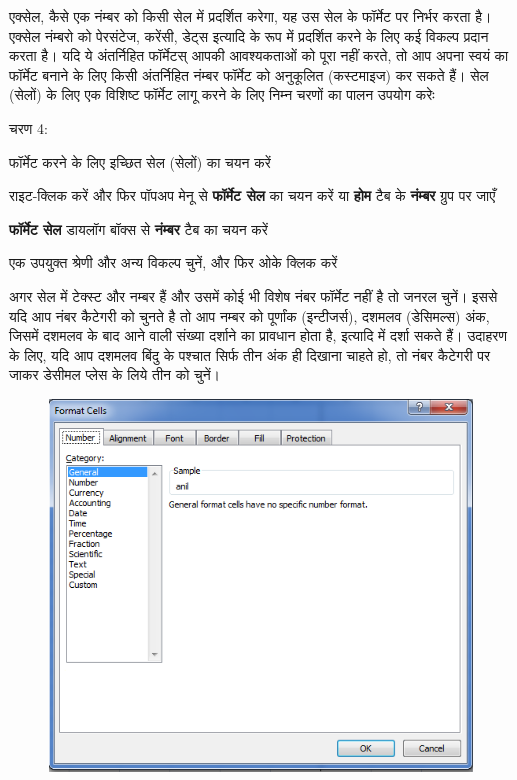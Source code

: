 एक्सेल, कैसे एक नंम्बर को किसी सेल में प्रदर्शित करेगा, यह उस सेल के फॉर्मेट पर निर्भर करता है। एक्सेल नंम्बरो को पेरसंटेज, करेंसी, डेट्स इत्यादि के रूप में प्रदर्शित करने के लिए कई विकल्प प्रदान करता है। यदि ये अंतर्निहित फॉर्मेटस् आपकी आवश्यकताओं को पूरा नहीं करते, तो आप अपना स्वयं का फॉर्मेट बनाने के लिए किसी अंतर्निहित नंम्बर फॉर्मेट को अनुकूलित (कस्टमाइज) कर सकते हैं। सेल (सेलों) के लिए एक विशिष्ट फॉर्मेट लागू करने के लिए निम्न चरणों का पालन उपयोग करेः
\begin{descriptionSimple}{चरण 4:}
\item[चरण 1] फॉर्मेट करने के लिए इच्छित सेल (सेलों) का चयन करें
\item[चरण 2] राइट-क्लिक करें और फिर पॉपअप मेनू से \textbf{फॉर्मेट सेल} का चयन करें या \textbf{होम} टैब के \textbf{नंम्बर} ग्रुप पर जाएँ
\item[चरण 3] \textbf{फॉर्मेट सेल} डायलॉग बॉक्स से \textbf{नंम्बर} टैब का चयन करें
\item[चरण 4] एक उपयुक्त श्रेणी और अन्य विकल्प चुनें, और फिर ओके क्लिक करें
\end{descriptionSimple}

अगर सेल में टेक्स्ट और नम्बर हैं और उसमें कोई भी विशेष नंबर फॉर्मेट नहीं है तो जनरल चुनें। इससे यदि आप नंबर कैटेगरी को चुनते है तो आप नम्बर को पूर्णांक (इन्टीजर्स), दशमलव (डेसिमल्स) अंक, जिसमें दशमलव के बाद आने वाली संख्या दर्शाने का प्रावधान होता है, इत्यादि में दर्शा सकते हैं। उदाहरण के लिए, यदि आप दशमलव बिंदु के पश्चात सिर्फ तीन अंक ही दिखाना चाहते हो, तो नंबर कैटेगरी पर जाकर डेसीमल प्लेस के लिये तीन को चुनें।
\begin{figure}[H]
\centering
\includegraphics[scale=.7]{src/images/chapter2/chapter2_fig15.png}
\end{figure}

